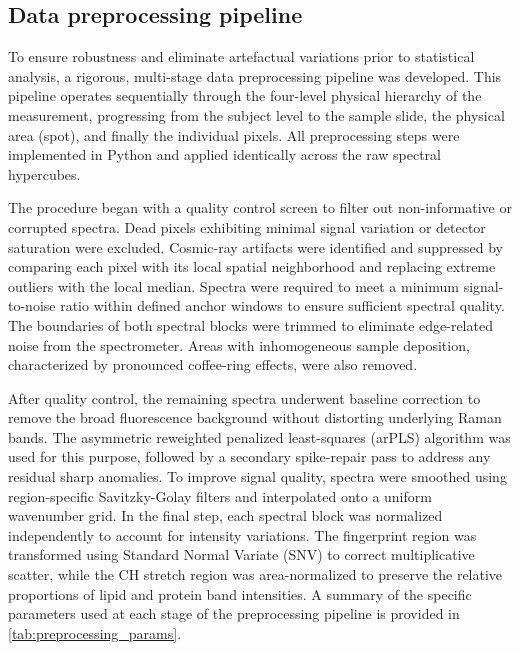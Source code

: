 \documentclass[preprint,12pt]{elsarticle}
\begin{document}
\subsection{Data preprocessing pipeline}
\label{subsec:preprocessing}

To ensure robustness and eliminate artefactual variations prior to statistical analysis, a rigorous, multi-stage data preprocessing pipeline was developed. This pipeline operates sequentially through the four-level physical hierarchy of the measurement, progressing from the subject level to the sample slide, the physical area (spot), and finally the individual pixels. All preprocessing steps were implemented in Python and applied identically across the raw spectral hypercubes.

The procedure began with a quality control screen to filter out non-informative or corrupted spectra. Dead pixels exhibiting minimal signal variation or detector saturation were excluded. Cosmic-ray artifacts were identified and suppressed by comparing each pixel with its local spatial neighborhood and replacing extreme outliers with the local median. Spectra were required to meet a minimum signal-to-noise ratio within defined anchor windows to ensure sufficient spectral quality. The boundaries of both spectral blocks were trimmed to eliminate edge-related noise from the spectrometer. Areas with inhomogeneous sample deposition, characterized by pronounced coffee-ring effects, were also removed.

After quality control, the remaining spectra underwent baseline correction to remove the broad fluorescence background without distorting underlying Raman bands. The asymmetric reweighted penalized least-squares (arPLS) algorithm was used for this purpose, followed by a secondary spike-repair pass to address any residual sharp anomalies. To improve signal quality, spectra were smoothed using region-specific Savitzky-Golay filters and interpolated onto a uniform wavenumber grid. In the final step, each spectral block was normalized independently to account for intensity variations. The fingerprint region was transformed using Standard Normal Variate (SNV) to correct multiplicative scatter, while the C\textendash H stretch region was area-normalized to preserve the relative proportions of lipid and protein band intensities. A summary of the specific parameters used at each stage of the preprocessing pipeline is provided in \cref{tab:preprocessing_params}.
\end{document}
